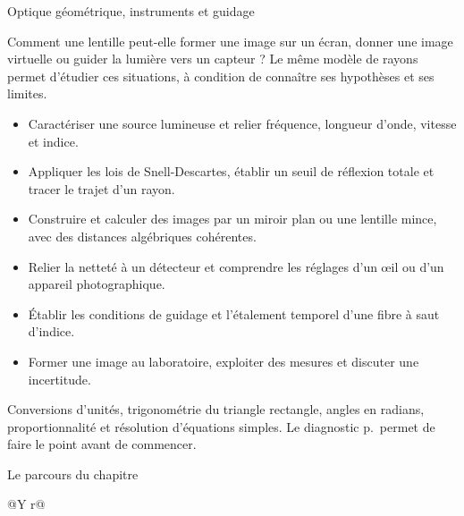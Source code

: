 \vspace{2mm}
{\otLight\fontsize{18}{23}\selectfont\color{otNavy}Optique géométrique, instruments et guidage}\par
\vspace{3mm}
Comment une lentille peut-elle former une image sur un écran, donner une image virtuelle ou guider la lumière vers un capteur ? Le même modèle de rayons permet d'étudier ces situations, à condition de connaître ses hypothèses et ses limites.
\begin{itemize}
\item Caractériser une source lumineuse et relier fréquence, longueur d'onde, vitesse et indice.
\item Appliquer les lois de Snell-Descartes, établir un seuil de réflexion totale et tracer le trajet d'un rayon.
\item Construire et calculer des images par un miroir plan ou une lentille mince, avec des distances algébriques cohérentes.
\item Relier la netteté à un détecteur et comprendre les réglages d'un œil ou d'un appareil photographique.
\item Établir les conditions de guidage et l'étalement temporel d'une fibre à saut d'indice.
\item Former une image au laboratoire, exploiter des mesures et discuter une incertitude.
\end{itemize}
Conversions d'unités, trigonométrie du triangle rectangle, angles en radians, proportionnalité et résolution d'équations simples. Le diagnostic p.\,\pageref{diagnostic} permet de faire le point avant de commencer.
\begin{loi}{Le parcours du chapitre}
\begin{tabularx}{\linewidth}{@{}Y r@{}}
\end{tabularx}
\end{loi}
